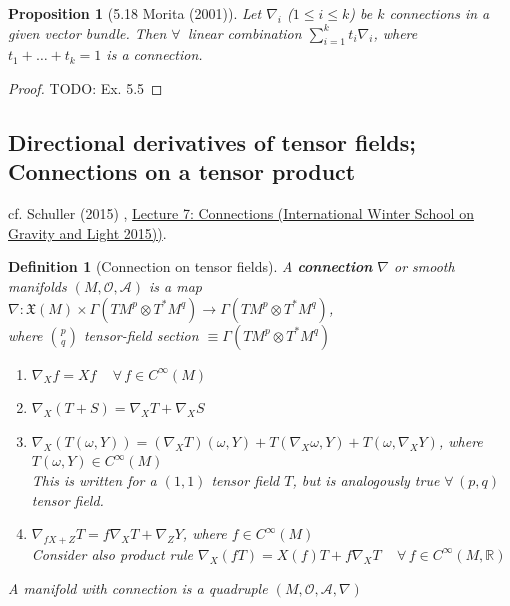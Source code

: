 \documentclass[10pt]{amsart}
\newtheorem{proposition}{Proposition}
\newtheorem{definition}{Definition}
\begin{document}
\begin{multicols*}{2}
\begin{proposition}[5.18 Morita (2001)\cite{Mori2001}]
Let $\nabla_i$ ($1 \leq i \leq k$) be $k$ connections in a given vector bundle. Then $\forall \, $ linear combination $\sum_{i=1}^k t_i \nabla_i$, where $t_1 + \dots + t_k =1$ is a connection.	
\end{proposition} 

\begin{proof}
	TODO: Ex. 5.5
\end{proof} 

\subsection{Directional derivatives of tensor fields; Connections on a tensor product}

cf. Schuller (2015) \cite{Schul2015}, \href{https://youtu.be/nEaiZBbCVtI}{Lecture 7: Connections (International Winter School on Gravity and Light 2015))}.

\begin{definition}[Connection on tensor fields]
	A \textbf{connection} $\nabla$ or smooth manifolds $(M, \mathcal{O}, \mathcal{A})$ is a map $\nabla : \mathfrak{X}(M) \times \Gamma(TM^p \otimes T^*M^q) \to \Gamma(TM^p \otimes T^*M^q)$, \\
	where $\binom{p}{q}$ tensor-field section $\equiv \Gamma (TM^p \otimes T^*M^q)$
	
	\begin{enumerate}
		\item $\nabla_X f = Xf \quad \, \forall \, f \in C^{\infty}(M)$ 
		\item $\nabla_X(T+S) = \nabla_XT  + \nabla_XS$ 
		\item $\nabla_X(T(\omega, Y)) = (\nabla_XT)(\omega, Y) + T(\nabla_X \omega, Y) + T(\omega, \nabla_X Y)$, where $T(\omega, Y) \in C^{\infty}(M)$ \\
		
		This is written for a $(1, 1)$ tensor field $T$, but is analogously true $\forall \, (p, q)$ tensor field. 
		\item $\nabla_{fX + Z} T = f\nabla_X T + \nabla_Z Y$, where $f\in C^{\infty}(M)$ \\
		
		Consider also product rule $\nabla_X(fT) = X(f) T + f\nabla_XT \quad \, \forall \, f \in C^{\infty}(M, \mathbb{R})$
	\end{enumerate}

A manifold with connection is a quadruple $(M, \mathcal{O}, \mathcal{A}, \nabla)$
\end{definition}


\end{multicols*}
\end{document}

